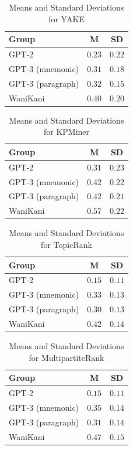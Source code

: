 \begin{table}[ht] 
\centering
\caption{Means and Standard Deviations for YAKE}
\label{table:group_stats}
\begin{tabular}{lcc}
\toprule
Group & M & SD\\
\midrule
GPT-2& $0.23$ & $0.22$ \\
GPT-3 (mnemonic) & $0.31$ & $0.18$ \\
GPT-3 (paragraph)& $0.32$ & $0.15$ \\
WaniKani & $0.40$ & $0.20$ \\
\bottomrule
\end{tabular}
\label{tab:yake_centrality}
\end{table}
\begin{table}[ht] 
\centering
\caption{Means and Standard Deviations for KPMiner}
\label{table:group_stats}
\begin{tabular}{lcc}
\toprule
Group & M & SD\\
\midrule
GPT-2& $0.31$ & $0.23$ \\
GPT-3 (mnemonic) & $0.42$ & $0.22$ \\
GPT-3 (paragraph)& $0.42$ & $0.21$ \\
WaniKani & $0.57$ & $0.22$ \\
\bottomrule
\end{tabular}
\label{tab:kpminer_centrality}
\end{table}
\begin{table}[ht] 
\centering
\caption{Means and Standard Deviations for TopicRank}
\label{table:group_stats}
\begin{tabular}{lcc}
\toprule
Group & M & SD\\
\midrule
GPT-2& $0.15$ & $0.11$ \\
GPT-3 (mnemonic) & $0.33$ & $0.13$ \\
GPT-3 (paragraph)& $0.30$ & $0.13$ \\
WaniKani & $0.42$ & $0.14$ \\
\bottomrule
\end{tabular}
\label{tab:topic_rank_centrality}
\end{table}
\begin{table}[ht] 
\centering
\caption{Means and Standard Deviations for MultipartiteRank}
\label{table:group_stats}
\begin{tabular}{lcc}
\toprule
Group & M & SD\\
\midrule
GPT-2& $0.15$ & $0.11$ \\
GPT-3 (mnemonic) & $0.35$ & $0.14$ \\
GPT-3 (paragraph)& $0.31$ & $0.14$ \\
WaniKani & $0.47$ & $0.15$ \\
\bottomrule
\end{tabular}
\label{tab:multipartite_rank_centrality}
\end{table}
